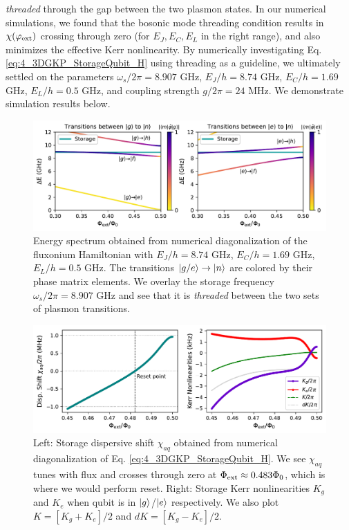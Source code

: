 \textit{threaded} through the gap between the two plasmon states. In our numerical simulations, we found that the bosonic mode threading condition results in $\chi(\varphi_{\rm ext})$ crossing through zero (for $E_J, E_C, E_L$ in the right range), and also minimizes the effective Kerr nonlinearity. By numerically investigating Eq. \eqref{eq:4_3DGKP_StorageQubit_H} using threading as a guideline, we ultimately settled on the parameters $\omega_s/2\pi = 8.907$ GHz, $E_J/h = 8.74$ GHz, $E_C/h = 1.69$ GHz, $E_L/h = 0.5$ GHz, and coupling strength $g/2\pi = 24$ MHz. We demonstrate simulation results below. 

\begin{figure}[h]
    \centering
    \includegraphics[width=0.95\linewidth]{Figures/4/3D_GKP_Theory_Spectrum.pdf}
    \caption{Energy spectrum obtained from numerical diagonalization of the fluxonium Hamiltonian with $E_J/h = 8.74$ GHz, $E_C/h = 1.69$ GHz, $E_L/h = 0.5$ GHz. The transitions $\lvert g/e\rangle\to\lvert n\rangle$ are colored by their phase matrix elements. We overlay the storage frequency $\omega_s/2\pi = 8.907$ GHz and see that it is \textit{threaded} between the two sets of plasmon transitions.}
    \label{fig:4_3D_GKP_Theory_Spectrum}
\end{figure}

\begin{figure}[h]
    \centering
    \includegraphics[width=0.95\linewidth]{Figures/4/3D_GKP_Theory_ChiKerr.pdf}
    \caption{Left: Storage dispersive shift $\chi_{aq}$ obtained from numerical diagonalization of Eq. \eqref{eq:4_3DGKP_StorageQubit_H}. We see $\chi_{aq}$ tunes with flux and crosses through zero at $\Phi_{\rm ext} \approx 0.483\Phi_0$, which is where we would perform reset. Right: Storage Kerr nonlinearities $K_g$ and $K_e$ when qubit is in $\lvert g\rangle$/$\lvert e\rangle$ respectively. We also plot $K = [K_g+K_e]/2$ and $dK = [K_g-K_e]/2$.}
    \label{fig:4_3D_GKP_Theory_ChiKerr}
\end{figure}

